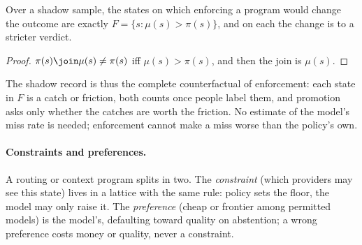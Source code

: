 \begin{proposition}
\label{prop:friction}
Over a shadow sample, the states on which enforcing a program would change
the outcome are exactly $F = \{s : \mu(s) > \pi(s)\}$, and on each the change
is to a stricter verdict.
\end{proposition}
\begin{proof}
$\pi(s) \join \mu(s) \ne \pi(s)$ iff $\mu(s) > \pi(s)$, and then the join is
$\mu(s)$.
\end{proof}

The shadow record is thus the complete counterfactual of enforcement: each
state in $F$ is a catch or friction, both counts once people label them, and
promotion asks only whether the catches are worth the friction. No estimate of
the model's miss rate is needed; enforcement cannot make a miss worse than the
policy's own.

\paragraph{Constraints and preferences.}
A routing or context program splits in two. The \emph{constraint} (which
providers may see this state) lives in a lattice with the same rule: policy
sets the floor, the model may only raise it. The \emph{preference} (cheap or
frontier among permitted models) is the model's, defaulting toward quality on
abstention; a wrong preference costs money or quality, never a constraint.
